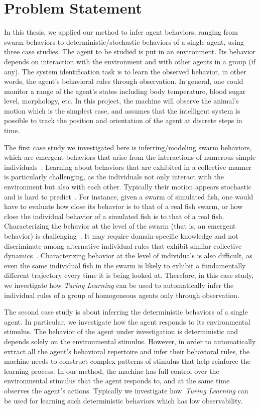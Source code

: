 \section{Problem Statement}

In this thesis, we applied our method to infer agent behaviors, ranging from swarm behaviors to deterministic/stochastic behaviors of a single agent, using three case studies. The agent to be studied is put in an environment. Its behavior depends on interaction with the environment and with other agents in a group (if any). The system identification task is to learn the observed behavior, in other words, the agent's behavioral rules through observation. In general, one could monitor a range of the agent's states including body temperature, blood sugar level, morphology, etc. In this project, the machine will observe the animal's motion which is the simplest case, and assumes that the intelligent system is possible to track the position and orientation of the agent at discrete steps in time. 

The first case study we investigated here is inferring/modeling swarm behaviors, which are emergent behaviors that arise from the interactions of numerous simple individuals~\cite{Camazine2001}. Learning about behaviors that are exhibited in a collective manner is particularly challenging, as the individuals not only interact with the environment but also with each other. Typically their motion appears stochastic and is hard to predict~\cite{Dirk2011}. For instance, given a swarm of simulated fish, one would have to evaluate how close its behavior is to that of a real fish swarm, or how close the individual behavior of a simulated fish is to that of a real fish. Characterizing the behavior at the level of the swarm (that is, an emergent behavior) is challenging~\cite{Harvey:SI:2015}. It may require domain-specific knowledge and not discriminate among alternative individual rules that exhibit similar collective dynamics~\cite{Weitz2012}. Characterizing behavior at the level of individuals is also difficult, as even the same individual fish in the swarm is likely to exhibit a fundamentally different trajectory every time it is being looked at. Therefore, in this case study, we investigate how \textit{Turing Learning} can be used to automatically infer the individual rules of a group of homogeneous agents only through observation.

The second case study is about inferring the deterministic behaviors of a single agent. In particular, we investigate how the agent responds to its environmental stimulus. The behavior of the agent under investigation is deterministic and depends solely on the environmental stimulus. However, in order to automatically extract all the agent's behavioral repertoire and infer their behavioral rules, the machine needs to construct complex patterns of stimulus that help reinforce the learning process. In our method, the machine has full control over the environmental stimulus that the agent responds to, and at the same time observes the agent's actions. Typically we investigate how~\textit{Turing Learning} can be used for learning such deterministic behaviors which has low observability.

